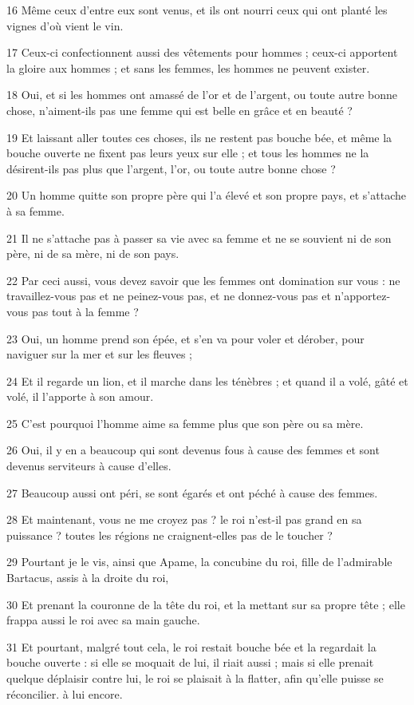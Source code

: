 \par 16 Même ceux d'entre eux sont venus, et ils ont nourri ceux qui ont planté les vignes d'où vient le vin.
\par 17 Ceux-ci confectionnent aussi des vêtements pour hommes ; ceux-ci apportent la gloire aux hommes ; et sans les femmes, les hommes ne peuvent exister.
\par 18 Oui, et si les hommes ont amassé de l'or et de l'argent, ou toute autre bonne chose, n'aiment-ils pas une femme qui est belle en grâce et en beauté ?
\par 19 Et laissant aller toutes ces choses, ils ne restent pas bouche bée, et même la bouche ouverte ne fixent pas leurs yeux sur elle ; et tous les hommes ne la désirent-ils pas plus que l'argent, l'or, ou toute autre bonne chose ?
\par 20 Un homme quitte son propre père qui l'a élevé et son propre pays, et s'attache à sa femme.
\par 21 Il ne s'attache pas à passer sa vie avec sa femme et ne se souvient ni de son père, ni de sa mère, ni de son pays.
\par 22 Par ceci aussi, vous devez savoir que les femmes ont domination sur vous : ne travaillez-vous pas et ne peinez-vous pas, et ne donnez-vous pas et n'apportez-vous pas tout à la femme ?
\par 23 Oui, un homme prend son épée, et s'en va pour voler et dérober, pour naviguer sur la mer et sur les fleuves ;
\par 24 Et il regarde un lion, et il marche dans les ténèbres ; et quand il a volé, gâté et volé, il l'apporte à son amour.
\par 25 C'est pourquoi l'homme aime sa femme plus que son père ou sa mère.
\par 26 Oui, il y en a beaucoup qui sont devenus fous à cause des femmes et sont devenus serviteurs à cause d'elles.
\par 27 Beaucoup aussi ont péri, se sont égarés et ont péché à cause des femmes.
\par 28 Et maintenant, vous ne me croyez pas ? le roi n'est-il pas grand en sa puissance ? toutes les régions ne craignent-elles pas de le toucher ?
\par 29 Pourtant je le vis, ainsi que Apame, la concubine du roi, fille de l'admirable Bartacus, assis à la droite du roi,
\par 30 Et prenant la couronne de la tête du roi, et la mettant sur sa propre tête ; elle frappa aussi le roi avec sa main gauche.
\par 31 Et pourtant, malgré tout cela, le roi restait bouche bée et la regardait la bouche ouverte : si elle se moquait de lui, il riait aussi ; mais si elle prenait quelque déplaisir contre lui, le roi se plaisait à la flatter, afin qu'elle puisse se réconcilier. à lui encore.

